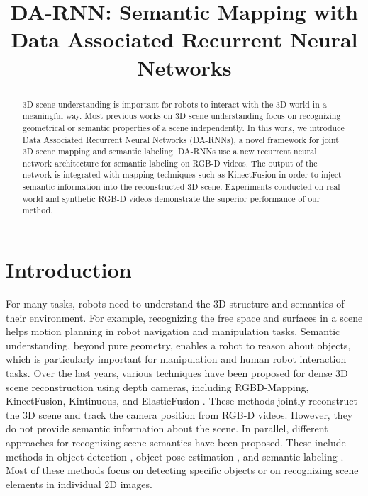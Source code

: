 \documentclass[conference]{IEEEtran}
\begin{document}
	
\title{DA-RNN: Semantic Mapping with Data Associated Recurrent Neural Networks}






\author{
}

\maketitle

\begin{abstract}
3D scene understanding is important for robots to interact with the 3D world in a meaningful way. Most previous works on 3D scene understanding focus on recognizing geometrical or semantic properties of a scene independently. In this work, we introduce Data Associated Recurrent Neural Networks (DA-RNNs), a novel framework for joint 3D scene mapping and semantic labeling. DA-RNNs use a new recurrent neural network architecture for semantic labeling on RGB-D videos. The output of the network is integrated with mapping techniques such as KinectFusion in order to inject semantic information into the reconstructed 3D scene. Experiments conducted on real world and synthetic RGB-D videos demonstrate the superior performance of our method.\end{abstract}

\IEEEpeerreviewmaketitle

\section{Introduction}

For many tasks, robots need to understand the 3D structure and semantics of their environment. For example, recognizing the free space and surfaces in a scene helps motion planning in robot navigation and manipulation tasks. Semantic understanding, beyond pure geometry, enables a robot to reason about objects, which is particularly important for manipulation and human robot interaction tasks. Over the last years, various techniques have been proposed for dense 3D scene reconstruction using depth cameras, including RGBD-Mapping, KinectFusion, Kintinuous, and ElasticFusion \cite{henry2012rgb,newcombe2011kinectfusion,Whe12Kin,whelan2015elasticfusion}.  These methods jointly reconstruct the 3D scene and track the camera position from RGB-D videos. However, they do not provide semantic information about the scene. In parallel, different approaches for recognizing scene semantics have been proposed. These include methods in object detection \cite{felzenszwalb2008discriminatively,girshick2014rich}, object pose estimation \cite{brachmann2014learning,savarese20073d,xiang2012estimating}, and semantic labeling \cite{ren2012rgb,long2015fully}. Most of these methods focus on detecting specific objects or on recognizing scene elements in individual 2D images.
\end{document}

